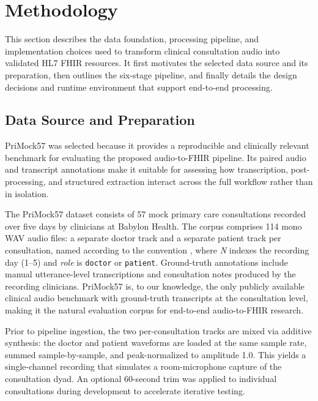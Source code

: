 
\section{Methodology}

\noindent This section describes the data foundation, processing pipeline, and implementation choices used to transform clinical consultation audio into validated HL7 FHIR resources. It first motivates the selected data source and its preparation, then outlines the six-stage pipeline, and finally details the design decisions and runtime environment that support end-to-end processing.

\subsection{Data Source and Preparation}

PriMock57 \cite{papadopoulos2022primock57} was selected because it provides a reproducible and clinically relevant benchmark for evaluating the proposed audio-to-FHIR pipeline. Its paired audio and transcript annotations make it suitable for assessing how transcription, post-processing, and structured extraction interact across the full workflow rather than in isolation.

The PriMock57 dataset consists of 57 mock primary care consultations recorded over five days by clinicians at Babylon Health. The corpus comprises 114 mono WAV audio files: a separate doctor track and a separate patient track per consultation, named according to the convention , where \textit{N} indexes the recording day (1–5) and \textit{role} is \texttt{doctor} or \texttt{patient}. Ground-truth annotations include manual utterance-level transcriptions and consultation notes produced by the recording clinicians. PriMock57 is, to our knowledge, the only publicly available clinical audio benchmark with ground-truth transcripts at the consultation level, making it the natural evaluation corpus for end-to-end audio-to-FHIR research.

Prior to pipeline ingestion, the two per-consultation tracks are mixed via additive synthesis: the doctor and patient waveforms are loaded at the same sample rate, summed sample-by-sample, and peak-normalized to amplitude 1.0. This yields a single-channel recording that simulates a room-microphone capture of the consultation dyad. An optional 60-second trim was applied to individual consultations during development to accelerate iterative testing.

